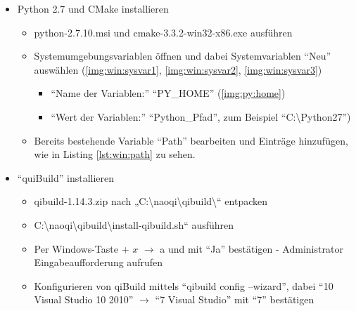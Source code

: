             \begin{itemize}
                \item Python 2.7 und CMake installieren
                \begin{itemize}
                    \item python-2.7.10.msi und cmake-3.3.2-win32-x86.exe
                        ausführen

                    \item Systemumgebungsvariablen öffnen und dabei
                        Systemvariablen ``Neu'' auswählen
                        (\autoref{img:win:sysvar1}, \autoref{img:win:sysvar2},
                        \autoref{img:win:sysvar3})

                    \begin{itemize}
                        \item ``Name der Variablen:'' ``PY\_HOME''
                            (\autoref{img:py:home})

                        \item ``Wert der Variablen:'' ``Python\_Pfad'',
                            zum Beispiel ``C:\textbackslash{}Python27'')
                    \end{itemize}

                    \item Bereits bestehende Variable ``Path'' bearbeiten und
                        Einträge hinzufügen, wie in Listing \ref{lst:win:path}
                        zu sehen.
                \end{itemize}

                \item ``quiBuild'' installieren
                \begin{itemize}
                    \item qibuild-1.14.3.zip nach „C:\textbackslash{}naoqi\textbackslash{}qibuild\textbackslash{}“ entpacken

                    \item C:\textbackslash{}naoqi\textbackslash{}qibuild\textbackslash{}install-qibuild.sh“ ausführen

                    \item Per Windows-Taste + $x$ $\rightarrow$ a und mit
                        ``Ja'' bestätigen - Administrator Eingabeaufforderung
                        aufrufen

                    \item Konfigurieren von qiBuild mittels
                        ``qibuild config --wizard'', dabei
                        ``10 Visual Studio 10 2010'' $\rightarrow$ ``7 Visual
                        Studio'' mit ``7'' bestätigen
                \end{itemize}


\end{itemize}
